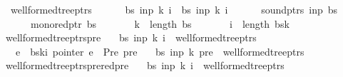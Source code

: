 \begin{isabellebody}
\ \ {\isachardoublequoteopen}wellformed{\isacharunderscore}{\kern0pt}tree{\isacharunderscore}{\kern0pt}ptrs\ {\isacharequal}{\kern0pt}\ {\isacharbraceleft}{\kern0pt}\isanewline
\ \ \ \ {\isacharparenleft}{\kern0pt}bs{\isacharcomma}{\kern0pt}\ inp{\isacharcomma}{\kern0pt}\ k{\isacharcomma}{\kern0pt}\ i{\isacharparenright}{\kern0pt}\ {\isacharbar}{\kern0pt}\ bs\ inp\ k\ i{\isachardot}{\kern0pt}\isanewline
\ \ \ \ \ \ sound{\isacharunderscore}{\kern0pt}ptrs\ inp\ bs\ {\isasymand}\isanewline
\ \ \ \ \ \ mono{\isacharunderscore}{\kern0pt}red{\isacharunderscore}{\kern0pt}ptr\ bs\ {\isasymand}\isanewline
\ \ \ \ \ \ k\ {\isacharless}{\kern0pt}\ length\ bs\ {\isasymand}\isanewline
\ \ \ \ \ \ i\ {\isacharless}{\kern0pt}\ length\ {\isacharparenleft}{\kern0pt}bs{\isacharbang}{\kern0pt}k{\isacharparenright}{\kern0pt}\isanewline
\ \ {\isacharbraceright}{\kern0pt}{\isachardoublequoteclose}\isanewline
\isanewline
{}\isamarkupfalse%
\ wellformed{\isacharunderscore}{\kern0pt}tree{\isacharunderscore}{\kern0pt}ptrs{\isacharunderscore}{\kern0pt}pre{\isacharcolon}{\kern0pt}\isanewline
\ \ \ {\isachardoublequoteopen}{\isacharparenleft}{\kern0pt}bs{\isacharcomma}{\kern0pt}\ inp{\isacharcomma}{\kern0pt}\ k{\isacharcomma}{\kern0pt}\ i{\isacharparenright}{\kern0pt}\ {\isasymin}\ wellformed{\isacharunderscore}{\kern0pt}tree{\isacharunderscore}{\kern0pt}ptrs{\isachardoublequoteclose}\isanewline
\ \ \ {\isachardoublequoteopen}e\ {\isacharequal}{\kern0pt}\ bs{\isacharbang}{\kern0pt}k{\isacharbang}{\kern0pt}i{\isachardoublequoteclose}\ {\isachardoublequoteopen}pointer\ e\ {\isacharequal}{\kern0pt}\ Pre\ pre{\isachardoublequoteclose}\isanewline
\ \ \ {\isachardoublequoteopen}{\isacharparenleft}{\kern0pt}bs{\isacharcomma}{\kern0pt}\ inp{\isacharcomma}{\kern0pt}\ {\isacharparenleft}{\kern0pt}k{\isacharminus}{\kern0pt}{}{\isacharparenright}{\kern0pt}{\isacharcomma}{\kern0pt}\ pre{\isacharparenright}{\kern0pt}\ {\isasymin}\ wellformed{\isacharunderscore}{\kern0pt}tree{\isacharunderscore}{\kern0pt}ptrs{\isachardoublequoteclose}%
\isadelimproof
%
\endisadelimproof
%
\isatagproof
%
\endisatagproof
{\isafoldproof}%
%
\isadelimproof
\isanewline
%
\endisadelimproof
{}\isamarkupfalse%
\ wellformed{\isacharunderscore}{\kern0pt}tree{\isacharunderscore}{\kern0pt}ptrs{\isacharunderscore}{\kern0pt}prered{\isacharunderscore}{\kern0pt}pre{\isacharcolon}{\kern0pt}\isanewline
\ \ \ {\isachardoublequoteopen}{\isacharparenleft}{\kern0pt}bs{\isacharcomma}{\kern0pt}\ inp{\isacharcomma}{\kern0pt}\ k{\isacharcomma}{\kern0pt}\ i{\isacharparenright}{\kern0pt}\ {\isasymin}\ wellformed{\isacharunderscore}{\kern0pt}tree{\isacharunderscore}{\kern0pt}ptrs{\isachardoublequoteclose}\isanewline

\end{isabellebody}
